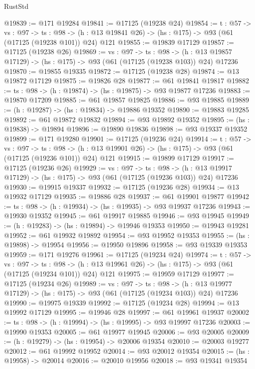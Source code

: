 \begin{lexlean}{RustStd}
\begin{coremodule}
@19839 := @171 @19284
@19841 := @17125 (@19238 @24)
@19854 := {t : @57} ->
  {vs : @97} ->
  {ts : @98} -> (h : @13 @19841 @26) -> (hs : @175) -> @93 (@61 (@17125 (@19238 @101)) @24) @121
@19855 := @19839 @17129
@19857 := @17125 (@19238 @26)
@19869 := {vs : @97} ->
  {ts : @98} ->
  (h : @13 @19857 @17129) -> (hs : @175) -> @93 (@61 (@17125 (@19238 @103)) @24) @17236
@19870 := @19855 @19335
@19872 := @17125 (@19238 @28)
@19874 := @13 @19872 @17129
@19875 := @19826 @28
@19877 := @61 @19841 @19817
@19882 := {ts : @98} -> (h : @19874) -> (hs : @19875) -> @93 @19877 @17236
@19883 := @19870 @17209
@19885 := @61 @19857 @19825
@19886 := @93 @19885
@19889 := (h : @19287) -> (hs : @19834) -> @19886 @19352
@19890 := @19883 @19285
@19892 := @61 @19872 @19832
@19894 := @93 @19892 @19352
@19895 := (hs : @19838) -> @19894
@19896 := @19890 @19836
@19898 := @93 @19337 @19352
@19899 := @171 @19280
@19901 := @17125 (@19236 @24)
@19914 := {t : @57} ->
  {vs : @97} ->
  {ts : @98} -> (h : @13 @19901 @26) -> (hs : @175) -> @93 (@61 (@17125 (@19236 @101)) @24) @121
@19915 := @19899 @17129
@19917 := @17125 (@19236 @26)
@19929 := {vs : @97} ->
  {ts : @98} ->
  (h : @13 @19917 @17129) -> (hs : @175) -> @93 (@61 (@17125 (@19236 @103)) @24) @17236
@19930 := @19915 @19337
@19932 := @17125 (@19236 @28)
@19934 := @13 @19932 @17129
@19935 := @19886 @28
@19937 := @61 @19901 @19877
@19942 := {ts : @98} -> (h : @19934) -> (hs : @19935) -> @93 @19937 @17236
@19943 := @19930 @19352
@19945 := @61 @19917 @19885
@19946 := @93 @19945
@19949 := (h : @19283) -> (hs : @19894) -> @19946 @19353
@19950 := @19943 @19281
@19952 := @61 @19932 @19892
@19954 := @93 @19952 @19353
@19955 := (hs : @19898) -> @19954
@19956 := @19950 @19896
@19958 := @93 @19339 @19353
@19959 := @171 @19276
@19961 := @17125 (@19234 @24)
@19974 := {t : @57} ->
  {vs : @97} ->
  {ts : @98} -> (h : @13 @19961 @26) -> (hs : @175) -> @93 (@61 (@17125 (@19234 @101)) @24) @121
@19975 := @19959 @17129
@19977 := @17125 (@19234 @26)
@19989 := {vs : @97} ->
  {ts : @98} ->
  (h : @13 @19977 @17129) -> (hs : @175) -> @93 (@61 (@17125 (@19234 @103)) @24) @17236
@19990 := @19975 @19339
@19992 := @17125 (@19234 @28)
@19994 := @13 @19992 @17129
@19995 := @19946 @28
@19997 := @61 @19961 @19937
@20002 := {ts : @98} -> (h : @19994) -> (hs : @19995) -> @93 @19997 @17236
@20003 := @19990 @19353
@20005 := @61 @19977 @19945
@20006 := @93 @20005
@20009 := (h : @19279) -> (hs : @19954) -> @20006 @19354
@20010 := @20003 @19277
@20012 := @61 @19992 @19952
@20014 := @93 @20012 @19354
@20015 := (hs : @19958) -> @20014
@20016 := @20010 @19956
@20018 := @93 @19341 @19354

\end{coremodule}
\end{lexlean}
